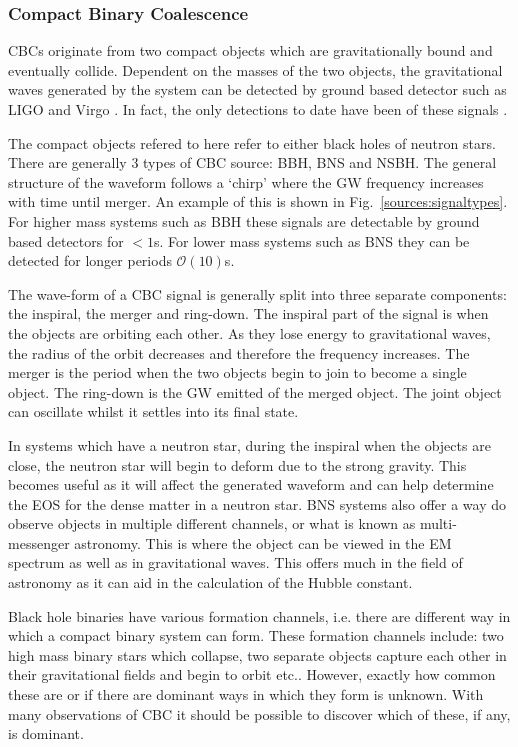 \subsubsection{\label{sources:transient:cbc} Compact Binary Coalescence}

\acp{CBC} originate from two compact objects which are gravitationally bound and eventually collide.
Dependent on the masses of the two objects, the gravitational waves generated by the system can be detected by ground based detector such as LIGO \citep{} and Virgo \citep{}. 
In fact, the only detections to date have been of these signals \citep{}.

The compact objects refered to here refer to either black holes of neutron stars.
There are generally 3 types of \ac{CBC} source: \ac{BBH}, \ac{BNS} and \ac{NSBH}.
The general structure of the waveform follows a `chirp' where the \ac{GW} frequency increases with time until merger. An example of this is shown in Fig.~\ref{sources:signaltypes}.
For higher mass systems such as \ac{BBH} these signals are detectable by ground based detectors for $< 1$s. 
For lower mass systems such as \ac{BNS} they can be detected for longer periods $\mathcal{O}(10)$s. 

The wave-form of a \ac{CBC} signal is generally split into three separate components: the inspiral, the merger and ring-down. 
The inspiral part of the signal is when the objects are orbiting each other. As they lose energy to gravitational waves, the radius of the orbit decreases and therefore the frequency increases.
The merger is the period when the two objects begin to join to become a single object.
The ring-down is the \ac{GW} emitted of the merged object. The joint object can oscillate whilst it settles into its final state. 

In systems which have a neutron star, during the inspiral when the objects are close, the neutron star will begin to deform due to the strong gravity. 
This becomes useful as it will affect the generated waveform and can help determine the \ac{EOS} for the dense matter in a neutron star.
\ac{BNS} systems also offer a way do observe objects in multiple different channels, or what is known as multi-messenger astronomy. 
This is where the object can be viewed in the \ac{EM} spectrum as well as in gravitational waves.
This offers much in the field of astronomy as it can aid in the calculation of the Hubble constant. 

Black hole binaries have various formation channels, i.e. there are different way in which a compact binary system can form. 
These formation channels include: two high mass binary stars which collapse, two separate objects capture each other in their gravitational fields and begin to orbit etc..
However, exactly how common these are or if there are dominant ways in which they form is unknown. 
With many observations of \ac{CBC} it should be possible to discover which of these, if any, is dominant.


